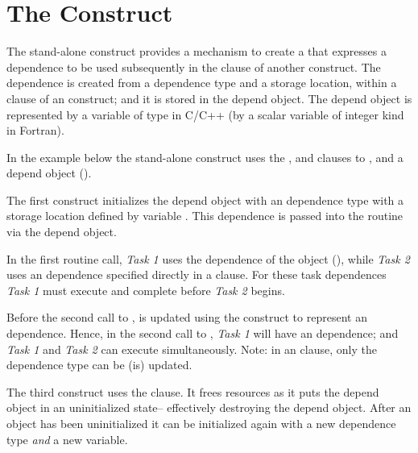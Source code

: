 \pagebreak
\section{The  Construct}
\label{sec:depobj}

The stand-alone  construct provides a mechanism 
to create a  that expresses a dependence to be 
used subsequently in the  clause of another construct.
The dependence is created from a dependence type and a storage location,
within a  clause of an  construct; 
and it is stored in the depend object.
The depend object is represented by a variable of type  
in C/C++ (by a scalar variable of integer kind  in Fortran).

In the example below the stand-alone  construct uses the 
,  and  clauses to 
,  and 
a depend object ().

The first  construct initializes the  
depend object with 
an  dependence type with a storage 
location defined by variable .  
This dependence is passed into the  
routine via the  depend object.

In the first  routine call, \emph{Task 1} uses
the dependence of the object (), 
while \emph{Task 2} uses an  dependence specified 
directly in a  clause.
For these task dependences \emph{Task 1} must execute and 
complete before \emph{Task 2} begins.

Before the second call to ,  is updated 
using the  construct to represent an  dependence. 
Hence, in the second call to , \emph{Task 1}
will have an  dependence; and \emph{Task 1} and 
\emph{Task 2} can execute simultaneously. Note: in an 
clause, only the dependence type can be (is) updated.

The third  construct uses the  clause.
It frees resources as it puts the depend object in an uninitialized state--
effectively destroying the depend object.
After an object has been uninitialized it can be initialized again
with a new dependence type \emph{and} a new variable.



